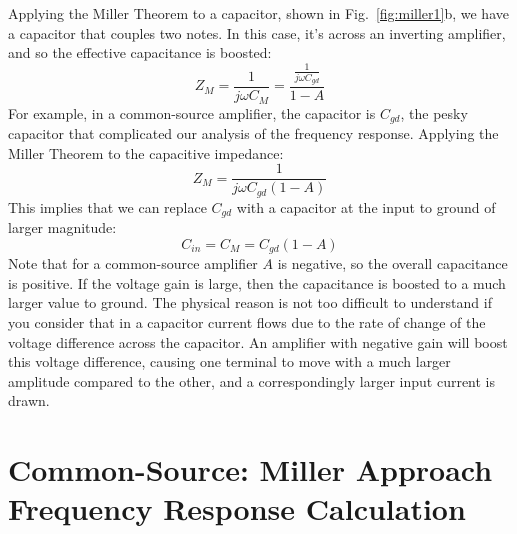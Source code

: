 Applying the Miller Theorem to a capacitor, shown in Fig.~\ref{fig:miller1}b, we have a capacitor that couples two notes.  In this case, it's across an inverting amplifier, and so the effective capacitance is boosted:
%
\begin{equation}
	Z_M = \frac{1}{j\omega C_M} = \frac{\frac{1}{j\omega C_{gd}}}{ 1 - A}
\end{equation}
%
For example, in a common-source amplifier, the capacitor is $C_{gd}$, the pesky capacitor that complicated our analysis of the frequency response.  Applying the Miller Theorem to the capacitive impedance: 
\begin{equation}
	Z_M = \frac{1}{j\omega C_{gd} (1 - A)}
\end{equation}
%
This implies that we can replace $C_{gd}$ with a capacitor at the input to ground of larger magnitude:
%
\begin{equation}
	C_{in} = C_M  = C_{gd} (1-A)
\end{equation}
%
Note that for a common-source amplifier $A$ is negative, so the overall capacitance is positive.  If the voltage gain is large, then the capacitance is boosted to a much larger value to ground.  The physical reason is not too difficult to understand if you consider that in a capacitor current flows due to the rate of change of the voltage difference  across the capacitor.  An amplifier with negative gain will boost this voltage difference, causing one terminal to move with a much larger amplitude compared to the other, and a correspondingly larger input current is drawn. 




\section{Common-Source:  Miller Approach Frequency Response Calculation}



